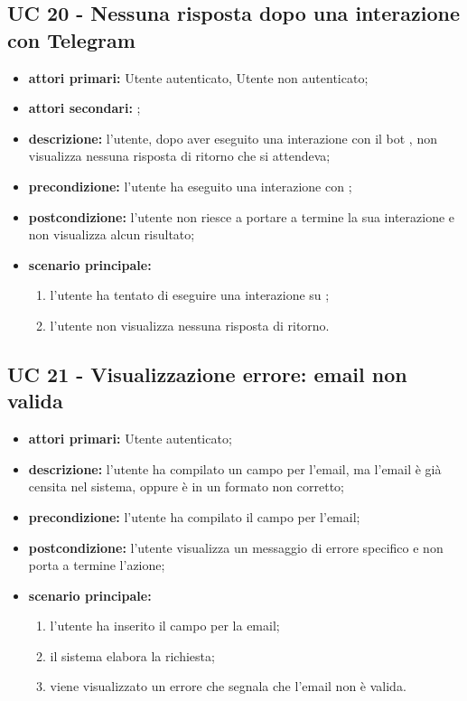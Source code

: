 
		\subsection{UC 20 - Nessuna risposta dopo una interazione con Telegram}
		\begin{itemize}
			\item \textbf{attori primari:} Utente autenticato, Utente non autenticato;
			\item \textbf{attori secondari:} ;
			\item \textbf{descrizione:} l'utente, dopo aver eseguito una interazione con il bot , non visualizza nessuna risposta di ritorno che si attendeva;
			\item \textbf{precondizione:} l'utente ha eseguito una interazione con ;
			\item \textbf{postcondizione:} l'utente non riesce a portare a termine la sua interazione e non visualizza alcun risultato;
			\item \textbf{scenario principale:}
			\begin{enumerate}
				\item l'utente ha tentato di eseguire una interazione su ;
				\item l'utente non visualizza nessuna risposta di ritorno.
			\end{enumerate}
		\end{itemize}



		\subsection{UC 21 - Visualizzazione errore: email non valida}
		\begin{itemize}
			\item \textbf{attori primari:} Utente autenticato;
			\item \textbf{descrizione:} l'utente ha compilato un campo per l'email, ma l'email è già censita nel sistema, oppure è in un formato non corretto;
			\item \textbf{precondizione:} l'utente ha compilato il campo per l'email;
			\item \textbf{postcondizione:} l'utente visualizza un messaggio di errore specifico e non porta a termine l'azione;
			\item \textbf{scenario principale:}
			\begin{enumerate}
				\item l'utente ha inserito il campo per la email;
				\item il sistema elabora la richiesta;
				\item viene visualizzato un errore che segnala che l'email non è valida.
			\end{enumerate}
		\end{itemize}

